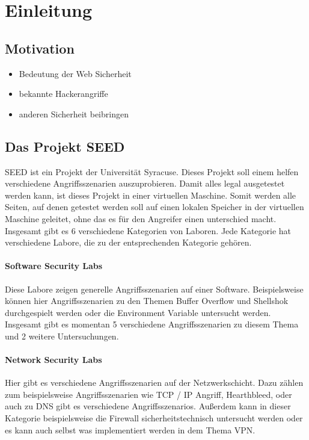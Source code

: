 \chapter{Einleitung}
\section{Motivation}
\begin{itemize}
	\item Bedeutung der Web Sicherheit
	\item bekannte Hackerangriffe
	\item anderen Sicherheit beibringen
\end{itemize}

\section{Das Projekt SEED}
SEED ist ein Projekt der Universität Syracuse. Dieses Projekt soll einem helfen verschiedene Angriffsszenarien auszuprobieren. Damit alles legal ausgetestet werden kann, ist dieses Projekt in einer virtuellen Maschine. Somit werden alle Seiten, auf denen getestet werden soll auf einen lokalen Speicher in der virtuellen Maschine geleitet, ohne das es für den Angreifer einen unterschied macht. \\
Insgesamt gibt es 6 verschiedene Kategorien von Laboren. Jede Kategorie hat verschiedene Labore, die zu der entsprechenden Kategorie gehören.
\subsubsection{Software Security Labs}
Diese Labore zeigen generelle Angriffsszenarien auf einer Software. Beispielsweise können hier Angriffsszenarien zu den Themen Buffer Overflow und Shellshok durchgespielt werden oder die Environment Variable untersucht werden. Insgesamt gibt es momentan 5 verschiedene Angriffsszenarien zu diesem Thema und 2 weitere Untersuchungen.
\subsubsection{Network Security Labs}
Hier gibt es verschiedene Angriffsszenarien auf der Netzwerkschicht. Dazu zählen zum beispielsweise Angriffsszenarien wie TCP / IP Angriff, Hearthbleed, oder auch zu DNS gibt es verschiedene Angriffsszenarios. Außerdem kann in dieser Kategorie beispielsweise die Firewall sicherheitstechnisch untersucht werden oder es kann auch selbst was implementiert werden in dem Thema VPN.
